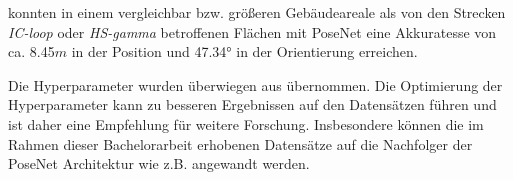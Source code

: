 \citet{walchImageBasedLocalizationUsing2017} konnten in einem vergleichbar bzw. größeren Gebäudeareale als von den Strecken \textit{IC-loop} oder \textit{HS-gamma} betroffenen Flächen mit PoseNet eine Akkuratesse von ca. 8.45$m$ in der Position und 47.34° in der Orientierung erreichen.







%







Die Hyperparameter wurden überwiegen aus \citet{acharyaBIMPoseNetIndoorCamera2019} übernommen. Die Optimierung der Hyperparameter kann zu besseren Ergebnissen auf den Datensätzen führen und ist daher eine Empfehlung für weitere Forschung. Insbesondere können die im Rahmen dieser Bachelorarbeit erhobenen Datensätze auf die Nachfolger der PoseNet Architektur wie z.B. \cite{kendallModellingUncertaintyDeep2016, walchImageBasedLocalizationUsing2017, kendallGeometricLossFunctions2017, clarkVidLocDeepSpatioTemporal2017} angewandt werden.


% 

